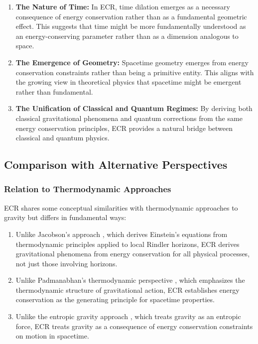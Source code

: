 \documentclass[11pt,a4paper]{article}
\begin{document}
\begin{enumerate}
    \item \textbf{The Nature of Time:} In ECR, time dilation emerges as a necessary consequence of energy conservation rather than as a fundamental geometric effect. This suggests that time might be more fundamentally understood as an energy-conserving parameter rather than as a dimension analogous to space.
    
    \item \textbf{The Emergence of Geometry:} Spacetime geometry emerges from energy conservation constraints rather than being a primitive entity. This aligns with the growing view in theoretical physics that spacetime might be emergent rather than fundamental.
    
    \item \textbf{The Unification of Classical and Quantum Regimes:} By deriving both classical gravitational phenomena and quantum corrections from the same energy conservation principles, ECR provides a natural bridge between classical and quantum physics.
\end{enumerate}

\subsection{Comparison with Alternative Perspectives}

\subsubsection{Relation to Thermodynamic Approaches}

ECR shares some conceptual similarities with thermodynamic approaches to gravity but differs in fundamental ways:

\begin{enumerate}
    \item Unlike Jacobson's approach \cite{jacobson1995}, which derives Einstein's equations from thermodynamic principles applied to local Rindler horizons, ECR derives gravitational phenomena from energy conservation for all physical processes, not just those involving horizons.
    
    \item Unlike Padmanabhan's thermodynamic perspective \cite{padmanabhan2010}, which emphasizes the thermodynamic structure of gravitational action, ECR establishes energy conservation as the generating principle for spacetime properties.
    
    \item Unlike the entropic gravity approach \cite{verlinde2011}, which treats gravity as an entropic force, ECR treats gravity as a consequence of energy conservation constraints on motion in spacetime.
\end{enumerate}
\end{document}
